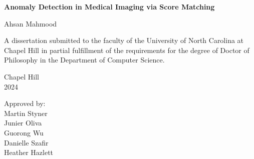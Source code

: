 \begin{titlepage}
\begin{center}


\vspace{2in}
\begin{singlespace}
\bf
Anomaly Detection in Medical Imaging via Score Matching
\end{singlespace}


\vspace{61pt} %
\large Ahsan Mahmood
\end{center}



\vspace{50pt}
\begin{singlespace}
\noindent \large
A dissertation submitted to the faculty of the University of North Carolina at Chapel Hill
in partial fulfillment of the requirements for the degree of Doctor of Philosophy in
the Department of Computer Science.
\end{singlespace}


\vspace{50pt}
\begin{center}
\begin{singlespace} \large
Chapel Hill\\
2024
\end{singlespace}
\end{center}


\vfill
\begin{flushright}
\begin{minipage}[t]{1.5in} \large
Approved by:\\
Martin Styner \\
Junier Oliva \\
Guorong Wu \\
Danielle Szafir \\
Heather Hazlett
\end{minipage}
\end{flushright}

\end{titlepage}
